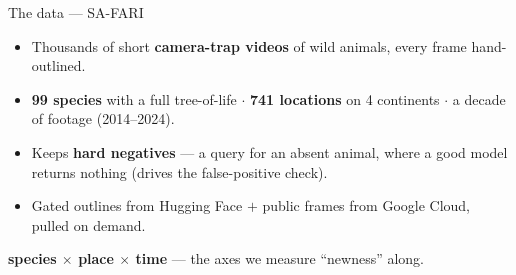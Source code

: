 \documentclass[aspectratio=169,11pt]{beamer}
\begin{document}
\begin{frame}{The data --- SA-FARI}
  \begin{itemize}
    \item Thousands of short \textbf{camera-trap videos} of wild animals, every frame hand-outlined.
    \item \textbf{99 species} with a full tree-of-life $\cdot$ \textbf{741 locations} on 4 continents
          $\cdot$ a decade of footage (2014--2024).
    \item Keeps \textbf{hard negatives} --- a query for an absent animal, where a good model returns
          nothing (drives the false-positive check).
    \item Gated outlines from Hugging Face $+$ public frames from Google Cloud, pulled on demand.
  \end{itemize}
  \vspace{0.3em}
  \begin{block}{}
    \centering \textbf{species $\times$ place $\times$ time} --- the axes we measure ``newness'' along.
  \end{block}
\end{frame}
\end{document}
